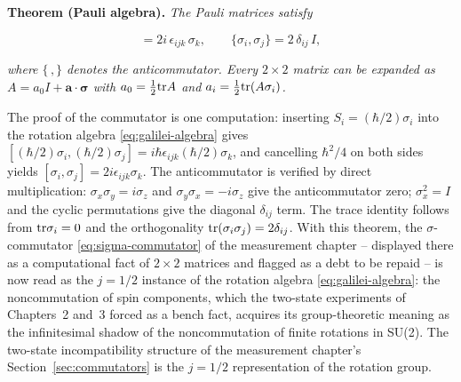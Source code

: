 \medskip\noindent\textbf{Theorem (Pauli algebra).} \emph{The Pauli matrices satisfy}
\begin{linenomath}
  \begin{equation}
    [\sigma_i,\sigma_j] = 2i\,\epsilon_{ijk}\,\sigma_k,
    \qquad
    \{\sigma_i,\sigma_j\} = 2\,\delta_{ij}\,I,
    \label{eq:pauli-algebra}
  \end{equation}
\end{linenomath}
\emph{where $\{\,,\}$ denotes the anticommutator. Every $2\times2$ matrix can be expanded as $A = a_0 I + \bm a\cdot\bm\sigma$ with $a_0 = \frac12\mathrm{tr} A$ and $a_i = \frac12\mathrm{tr}(A\sigma_i)$.}

The proof of the commutator is one computation: inserting $S_i = (\hbar/2)\sigma_i$ into the rotation algebra \eqref{eq:galilei-algebra} gives $[(\hbar/2)\sigma_i, (\hbar/2)\sigma_j] = i\hbar\epsilon_{ijk}(\hbar/2)\sigma_k$, and cancelling $\hbar^2/4$ on both sides yields $[\sigma_i,\sigma_j] = 2i\epsilon_{ijk}\sigma_k$. The anticommutator is verified by direct multiplication: $\sigma_x\sigma_y = i\sigma_z$ and $\sigma_y\sigma_x = -i\sigma_z$ give the anticommutator zero; $\sigma_x^2 = I$ and the cyclic permutations give the diagonal $\delta_{ij}$ term. The trace identity follows from $\mathrm{tr}\sigma_i = 0$ and the orthogonality $\mathrm{tr}(\sigma_i\sigma_j) = 2\delta_{ij}$. With this theorem, the $\sigma$-commutator \eqref{eq:sigma-commutator} of the measurement chapter -- displayed there as a computational fact of $2\times2$ matrices and flagged as a debt to be repaid -- is now read as the $j = 1/2$ instance of the rotation algebra \eqref{eq:galilei-algebra}: the noncommutation of spin components, which the two-state experiments of Chapters~2 and~3 forced as a bench fact, acquires its group-theoretic meaning as the infinitesimal shadow of the noncommutation of finite rotations in SU(2). The two-state incompatibility structure of the measurement chapter's Section~\ref{sec:commutators} is the $j=1/2$ representation of the rotation group.

